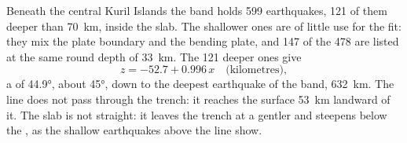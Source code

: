 Beneath the central Kuril Islands the band holds 599 earthquakes, 121 of them
deeper than \qty{70}{km}, inside the slab. The shallower ones are of little use
for the fit: they mix the plate boundary and the bending plate, and 147 of the
478 are listed at the same round depth of \qty{33}{km}. The 121 deeper ones give
\[
  z = -52.7 + 0.996\,x \quad\text{(kilometres)},
\]
a  of \ang{44.9}, about \ang{45}, down to the deepest earthquake of the band,
\qty{632}{km}. The line does not pass through the trench: it reaches the
surface \qty{53}{km} landward of it. The slab is not straight: it leaves the
trench at a gentler  and steepens below the , as the shallow
earthquakes above the line show.


